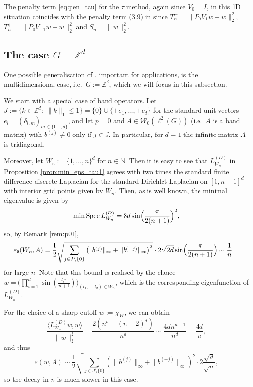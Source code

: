 \documentclass{article}
\newcommand\N{{\mathbb N}}
\newcommand\W{{\mathcal W}}
\newcommand\Z{{\mathbb Z}}
\newcommand\Spec{{\rm Spec}\,}  %
\numberwithin{equation}{section}   %
\numberwithin{figure}{section}  %
\begin{document}
The penalty term \eqref{eq:pen_tau} for the $\tau$ method, again since $V_0=I$, in this 1D situation coincides with the penalty term (3.9) in \cite[Proposition 3.3]{CW.Heng.ML:JST} since $T_n^-=\|P_0V_1w-w\|_2^2$, $T_n^+=\|P_0V_{-1}w-w\|_2^2$ and $S_n=\|w\|_2^2$.


\subsection{The case \texorpdfstring{$G=\Z^d$}{G=Zd}}\label{sec:Zd}

One possible generalisation of \cite{CW.Heng.ML:JST}, important for applications, is the multidimensional case, i.e.\ $G:=\Z^d$, which we will focus in this subsection.

We start with a special case of band operators.
Let $J:=\{k\in \Z^d:\; \|k\|_1\leq 1\} = \{0\}\cup\{\pm e_1,\ldots,\pm e_d\}$ for the standard unit vectors $e_l = (\delta_{l,m})_{m\in \{1\,\ldots,d\}}$, and let $p=0$ and $A\in\W_0(\ell^2(G))$ (i.e.\ $A$ is a band matrix) with $b^{(j)} \neq 0$ only if $j\in J$. In particular, for $d=1$ the infinite matrix $A$ is tridiagonal.

Moreover, let $W_n:=\{1,\ldots,n\}^d$ for $n\in\N$. Then it is easy to see that $L_{W_n}^{(D)}$ in Proposition \ref{prop:min_eps_tau1} agrees with two times the standard finite difference discrete Laplacian for the standard Dirichlet Laplacian on $[0,n+1]^d$ with interior grid points given by $W_n$.
Then, as is well known, the minimal eigenvalue is given by
\[\min \Spec L_{W_n}^{(D)} = 8d \sin\Bigl(\frac{\pi}{2(n+1)}\Bigr)^2,\]
so, by Remark \ref{rem:p01},
\begin{align*}
    \varepsilon_0(W_n,A) & = \frac{1}{2}\sqrt{\sum_{j\in J\setminus\{0\}} \left(\|b^{(j)}\|_\infty+\|b^{(-j)}\|_\infty\right)^2} \cdot 2\sqrt{2d}\sin\Bigl(\frac{\pi}{2(n+1)}\Bigr) \sim \frac{1}{n}
\end{align*}
for large $n$. Note that this bound is realised by the choice $w=\big(\prod_{i=1}^d\sin(\frac{l_i \pi}{n+1})\big)_{(l_1,\ldots,l_d)\in W_n}$, which is the corresponding eigenfunction of $L_{W_n}^{(D)}$.



For the choice of a sharp cutoff $w:=\chi_W$, we can obtain
\[\frac{\langle L_{W_n}^{(D)}w, w\rangle}{\|w\|_2^2} = \frac{2(n^d-(n-2)^d)}{n^d} \sim \frac{4dn^{d-1}}{n^d} = \frac{4d}{n},\]
and thus
\[\varepsilon(w,A) \sim \frac{1}{2}\sqrt{\sum_{j\in J\setminus\{0\}} \left(\|b^{(j)}\|_\infty+\|b^{(-j)}\|_\infty\right)^2} \cdot 2\frac{\sqrt{d}}{\sqrt{n}},\]
so the decay in $n$ is much slower in this case.
\end{document}
